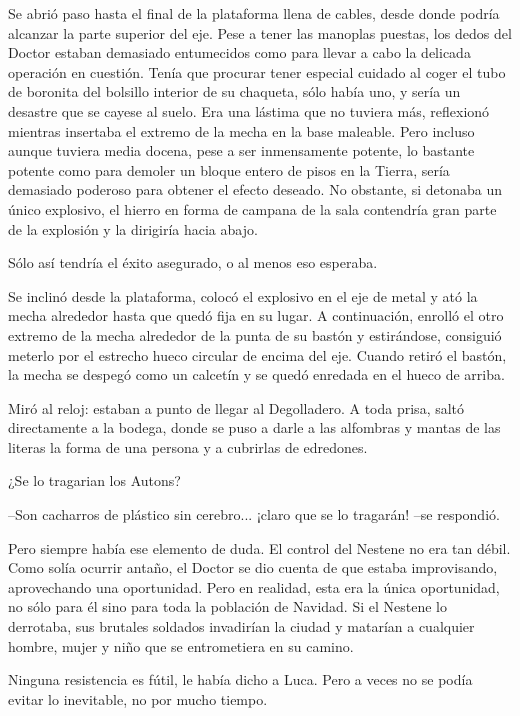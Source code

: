Se abrió paso hasta el final de la plataforma llena de cables, desde donde podría alcanzar la parte superior del eje. Pese a tener las manoplas puestas, los dedos del Doctor estaban demasiado entumecidos como para llevar a cabo la delicada operación en cuestión. Tenía que procurar tener especial cuidado al coger el tubo de boronita del bolsillo interior de su chaqueta, sólo había uno, y sería un desastre que se cayese al suelo. Era una lástima que no tuviera más, reflexionó mientras insertaba el extremo de la mecha en la base maleable. Pero incluso aunque tuviera media docena, pese a ser inmensamente potente, lo bastante potente como para demoler un bloque entero de pisos en la Tierra, sería demasiado poderoso para obtener el efecto deseado. No obstante, si detonaba un único explosivo, el hierro en forma de campana de la sala contendría gran parte de la explosión y la dirigiría hacia abajo.
 
Sólo así tendría el éxito asegurado, o al menos eso esperaba.
 
Se inclinó desde la plataforma, colocó el explosivo en el eje de metal y ató la mecha alrededor hasta que quedó fija en su lugar. A continuación, enrolló el otro extremo de la mecha alrededor de la punta de su bastón y estirándose, consiguió meterlo por el estrecho hueco circular de encima del eje. Cuando retiró el bastón, la mecha se despegó como un calcetín y se quedó enredada en el hueco de arriba.
 
Miró al reloj: estaban a punto de llegar al Degolladero. A toda prisa, saltó directamente a la bodega, donde se puso a darle a las alfombras y mantas de las literas la forma de una persona y a cubrirlas de edredones.
 
¿Se lo tragarian los Autons?
 
--Son cacharros de plástico sin cerebro... ¡claro que se lo tragarán! --se respondió.
 
Pero siempre había ese elemento de duda. El control del Nestene no era tan débil. Como solía ocurrir antaño, el Doctor se dio cuenta de que estaba improvisando, aprovechando una oportunidad. Pero en realidad, esta era la única oportunidad, no sólo para él sino para toda la población de Navidad. Si el Nestene lo derrotaba, sus brutales soldados invadirían la ciudad y matarían a cualquier hombre, mujer y niño que se entrometiera en su camino.
 
Ninguna resistencia es fútil, le había dicho a Luca. Pero a veces no se podía evitar lo inevitable, no por mucho tiempo.
 
